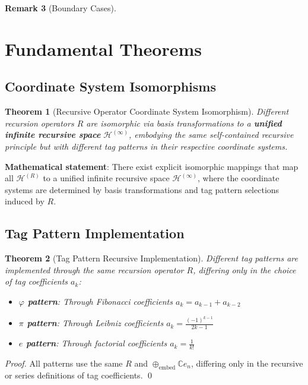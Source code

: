 \documentclass[12pt]{article}
\theoremstyle{plain}
\newtheorem{theorem}{Theorem}[section]
\theoremstyle{definition}
\newtheorem{remark}[theorem]{Remark}
\begin{document}
\begin{remark}[Boundary Cases]
\section{Fundamental Theorems}

\subsection{Coordinate System Isomorphisms}

\begin{theorem}[Recursive Operator Coordinate System Isomorphism]
Different recursion operators $R$ are isomorphic via basis transformations to a \textbf{unified infinite recursive space} $\mathcal{H}^{(\infty)}$, embodying the same self-contained recursive principle but with different tag patterns in their respective coordinate systems.
\end{theorem}

\textbf{Mathematical statement}: There exist explicit isomorphic mappings that map all $\mathcal{H}^{(R)}$ to a unified infinite recursive space $\mathcal{H}^{(\infty)}$, where the coordinate systems are determined by basis transformations and tag pattern selections induced by $R$.

\subsection{Tag Pattern Implementation}

\begin{theorem}[Tag Pattern Recursive Implementation]
Different tag patterns are implemented through the same recursion operator $R$, differing only in the choice of tag coefficients $a_k$:

\begin{itemize}
\item \textbf{$\varphi$ pattern}: Through Fibonacci coefficients $a_k = a_{k-1} + a_{k-2}$
\item \textbf{$\pi$ pattern}: Through Leibniz coefficients $a_k = \frac{(-1)^{k-1}}{2k-1}$
\item \textbf{$e$ pattern}: Through factorial coefficients $a_k = \frac{1}{k!}$
\end{itemize}
\end{theorem}

\begin{proof}
All patterns use the same $R$ and $\oplus_{\text{embed}} \mathbb{C} e_n$, differing only in the recursive or series definitions of tag coefficients. \qed
\end{proof}


\end{remark}
\end{document}
